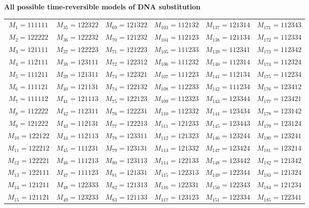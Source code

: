 \documentclass{svmult}
\begin{document}
{\bf All possible time-reversible models of DNA substitution}

\begin{center}
\begin{tabular}{cccccc} \hline
  $M_{1} = 111111$ &  $M_{35} = 122322$ &  $M_{69} = 121322$ & $M_{103} = 112132$ & $M_{137} = 121314$ & $M_{171} = 112343$ \\
  $M_{2} = 122222$ &  $M_{36} = 122232$ &  $M_{70} = 121232$ & $M_{104} = 112123$ & $M_{138} = 121134$ & $M_{172} = 112334$ \\
  $M_{3} = 121111$ &  $M_{37} = 122223$ &  $M_{71} = 121223$ & $M_{105} = 111233$ & $M_{139} = 112341$ & $M_{173} = 112342$ \\
  $M_{4} = 112111$ &  $M_{38} = 123111$ &  $M_{72} = 122312$ & $M_{106} = 111232$ & $M_{140} = 112314$ & $M_{174} = 112324$ \\
  $M_{5} = 111211$ &  $M_{39} = 121311$ &  $M_{73} = 122321$ & $M_{107} = 111223$ & $M_{141} = 112134$ & $M_{175} = 112234$ \\
  $M_{6} = 111121$ &  $M_{40} = 121131$ &  $M_{74} = 122132$ & $M_{108} = 112233$ & $M_{142} = 111234$ & $M_{176} = 123412$ \\
  $M_{7} = 111112$ &  $M_{41} = 121113$ &  $M_{75} = 122123$ & $M_{109} = 112323$ & $M_{143} = 123344$ & $M_{177} = 123421$ \\
  $M_{8} = 112222$ &  $M_{42} = 112311$ &  $M_{76} = 122231$ & $M_{110} = 112332$ & $M_{144} = 123434$ & $M_{178} = 123142$ \\
  $M_{9} = 121222$ &  $M_{43} = 112131$ &  $M_{77} = 122213$ & $M_{111} = 121233$ & $M_{145} = 123443$ & $M_{179} = 123124$ \\
 $M_{10} = 122122$ &  $M_{44} = 112113$ &  $M_{78} = 123311$ & $M_{112} = 121323$ & $M_{146} = 123244$ & $M_{180} = 123241$ \\
 $M_{11} = 122212$ &  $M_{45} = 111231$ &  $M_{79} = 123131$ & $M_{113} = 121332$ & $M_{147} = 123424$ & $M_{181} = 123214$ \\
 $M_{12} = 122221$ &  $M_{46} = 111213$ &  $M_{80} = 123113$ & $M_{114} = 122133$ & $M_{148} = 123442$ & $M_{182} = 121342$ \\
 $M_{13} = 122111$ &  $M_{47} = 111123$ &  $M_{81} = 121331$ & $M_{115} = 122313$ & $M_{149} = 122344$ & $M_{183} = 121324$ \\
 $M_{14} = 121211$ &  $M_{48} = 122333$ &  $M_{82} = 121313$ & $M_{116} = 122331$ & $M_{150} = 122343$ & $M_{184} = 121234$ \\
 $M_{15} = 121121$ &  $M_{49} = 123233$ &  $M_{83} = 121133$ & $M_{117} = 123123$ & $M_{151} = 122334$ & $M_{185} = 122341$ \\

\end{tabular}
\end{center}
\end{document}
